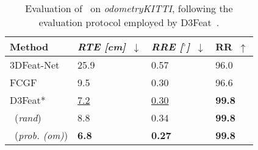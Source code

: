 
\begin{table}[t]
    \setlength{\tabcolsep}{6pt}
    \renewcommand{\arraystretch}{1.2}
	\centering
    \begin{tabularx}{\columnwidth}{lYYY}
			\hline
			Method & \textit{RTE [cm]}~$\downarrow$ & \textit{RRE [$^\circ$]}~$\downarrow$ & RR~$\uparrow$  \\
			\hline
 			3DFeat-Net~\cite{yew20183dfeat} & 25.9 &  0.57 & 96.0  \\
 			FCGF~\cite{Choy2019FCGF} & 9.5  & 0.30  & 96.6\\
 			D3Feat*~\cite{bai2020d3feat} & \underline{7.2} %
 			& \underline{0.30} %
 			& \textbf{99.8} \\
 			\acro\ (\textit{rand}) & 8.8 & 0.34 & \textbf{99.8}  \\ 
 			\acro\ (\textit{prob. (om)}) &  \textbf{6.8} & \textbf{0.27} & \textbf{99.8} \\
			\hline
	\end{tabularx}
	\caption{Evaluation of \acro\ on \emph{odometryKITTI}, following the evaluation protocol employed by D3Feat~\cite{bai2020d3feat}.}
	\label{tab:kitti}
\end{table}